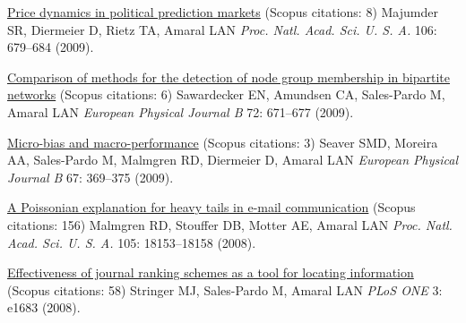 \NumberedItem{\makebox[0.8cm][r]{[80]}}
\href{/people/amaral/price-dynamics-in-political-prediction-markets}
{Price dynamics in political prediction markets}
    (Scopus citations: 8)
\newline
Majumder SR, Diermeier D, Rietz TA, Amaral LAN
\newline
\textit{Proc. Natl. Acad. Sci. U. S. A.}
    106:
679--684 (2009).
\newline
\Gap
~
\Gap

\NumberedItem{\makebox[0.8cm][r]{[79]}}
\href{/people/amaral/comparison-of-methods-for-the-detection-of-node-group-membership-in-bipartite-networks}
{Comparison of methods for the detection of node group membership in bipartite networks}
    (Scopus citations: 6)
\newline
Sawardecker EN, Amundsen CA, Sales-Pardo M, Amaral LAN
\newline
\textit{European Physical Journal B}
    72:
671--677 (2009).
\newline
\Gap
~
\Gap

\NumberedItem{\makebox[0.8cm][r]{[78]}}
\href{/people/amaral/micro-bias-and-macro-performance}
{Micro-bias and macro-performance}
    (Scopus citations: 3)
\newline
Seaver SMD, Moreira AA, Sales-Pardo M, Malmgren RD, Diermeier D, Amaral LAN
\newline
\textit{European Physical Journal B}
    67:
369--375 (2009).
\newline
\Gap
~
\Gap

\NumberedItem{\makebox[0.8cm][r]{[77]}}
\href{/people/amaral/a-poissonian-explanation-for-heavy-tails-in-e-mail-communication}
{A Poissonian explanation for heavy tails in e-mail communication}
    (Scopus citations: 156)
\newline
Malmgren RD, Stouffer DB, Motter AE, Amaral LAN
\newline
\textit{Proc. Natl. Acad. Sci. U. S. A.}
    105:
18153--18158 (2008).
\newline
\Gap
~
\Gap

\NumberedItem{\makebox[0.8cm][r]{[76]}}
\href{/people/amaral/effectiveness-journal-ranking-schemes-as-tool-for-locating-information}
{Effectiveness of journal ranking schemes as a tool for locating information}
    (Scopus citations: 58)
\newline
Stringer MJ, Sales-Pardo M, Amaral LAN
\newline
\textit{PLoS ONE}
    3:
e1683 (2008).
\newline
\Gap
~
\Gap


